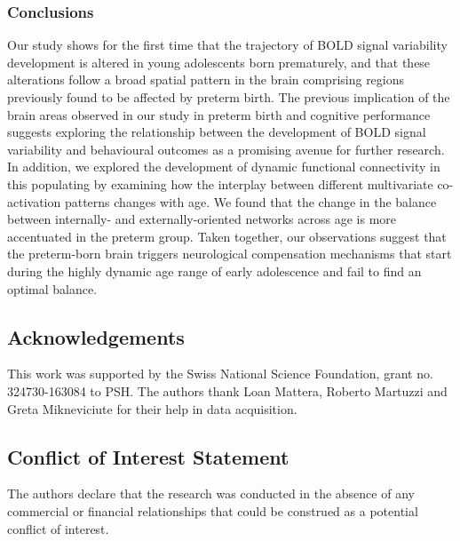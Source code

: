 \subsubsection*{Conclusions}
Our study shows for the first time that the trajectory of BOLD signal variability development is altered in young adolescents born prematurely, and that these alterations follow a broad spatial pattern in the brain comprising regions previously found to be affected by preterm birth. The previous implication of the brain areas observed in our study in preterm birth and cognitive performance suggests exploring the relationship between the development of BOLD signal variability and behavioural outcomes as a promising avenue for further research. In addition, we explored the development of dynamic functional connectivity in this populating by examining how the interplay between different multivariate co-activation patterns changes with age. We found that the change in the balance between  internally- and externally-oriented networks across age is more accentuated in the preterm group. Taken together, our observations suggest that the preterm-born brain triggers neurological compensation mechanisms that start during the highly dynamic age range of early adolescence and fail to find an optimal balance. 





\subsection*{Acknowledgements}
This work was supported by the Swiss National Science Foundation, grant no. 324730-163084 to PSH. The authors thank Loan Mattera, Roberto Martuzzi and Greta Mikneviciute for their help in data acquisition. 

\subsection*{Conflict of Interest Statement}
The authors declare that the research was conducted in the absence of any commercial or financial relationships that could be construed as a potential conflict of interest.








